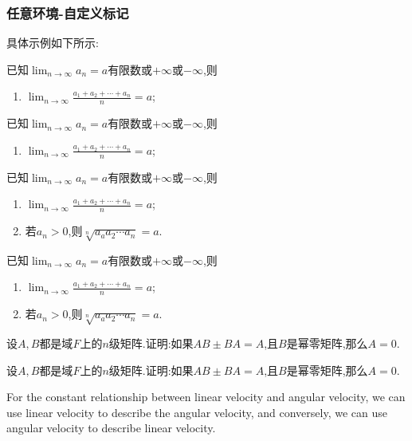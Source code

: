 \subsubsection{任意环境-自定义标记}
具体示例如下所示:
\begin{anymark}[总结~证明极限存在性常用二法]
    已知$\lim_{n\to\infty}a_n=a$\;有限数或$+\infty$或$-\infty$,则
    \begin{enumerate}
        \item $\lim_{n\to\infty}\frac{a_1+a_2+\cdots+a_n}{n}=a$;
    \end{enumerate}
\end{anymark}
\begin{tcblisting}{}
\begin{anymark}[总结~证明极限存在性常用二法]
已知$\lim_{n\to\infty}a_n=a$\;有限数或$+\infty$或$-\infty$,则
\begin{enumerate}
    \item $\lim_{n\to\infty}\frac{a_1+a_2+\cdots+a_n}{n}=a$;
\end{enumerate}
\end{anymark}
\end{tcblisting}

    \begin{anymark}[注解~证明极限存在性常用二法]{}
    已知$\lim_{n\to\infty}a_n=a$\;有限数或$+\infty$或$-\infty$,则
    \begin{enumerate}
        \item $\lim_{n\to\infty}\frac{a_1+a_2+\cdots+a_n}{n}=a$;
        \item 若$a_n>0$,则$\sqrt[n]{a_a a_2 \cdots a_n}=a$.
    \end{enumerate}
\end{anymark}

\begin{tcblisting}{}
\begin{anymark}[注解~证明极限存在性常用二法]{}
已知$\lim_{n\to\infty}a_n=a$\;有限数或$+\infty$或$-\infty$,则
\begin{enumerate}
    \item $\lim_{n\to\infty}\frac{a_1+a_2+\cdots+a_n}{n}=a$;
    \item 若$a_n>0$,则$\sqrt[n]{a_a a_2 \cdots a_n}=a$.
\end{enumerate}
\end{anymark}
\end{tcblisting}
%
\begin{mybox1}
    设$A,B$都是域$F$上的$n$级矩阵.证明:如果$AB\pm BA=A$,且$B$是幂零矩阵,那么$A=0$.
\end{mybox1}
\begin{tcblisting}{}
\begin{mybox1}
    设$A,B$都是域$F$上的$n$级矩阵.证明:如果$AB\pm BA=A$,且$B$是幂零矩阵,那么$A=0$.
\end{mybox1}
\end{tcblisting}
%
\begin{marker}
    For the constant relationship between linear velocity and angular velocity, we can use linear velocity to describe the angular velocity, and conversely, we can use angular velocity to describe linear velocity.
\end{marker}

